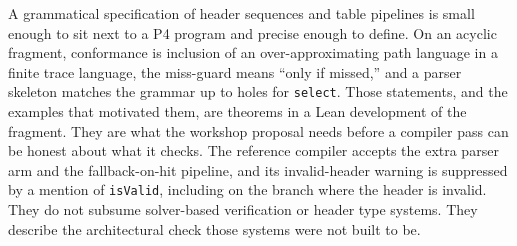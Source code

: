\documentclass[a4paper,UKenglish,cleveref,autoref]{lipics-v2021}
\begin{document}
A grammatical specification of header sequences and table pipelines is small enough to sit next to a P4 program and precise enough to define.
On an acyclic fragment, conformance is inclusion of an over-approximating path language in a finite trace language, the miss-guard means ``only if missed,'' and a parser skeleton matches the grammar up to holes for \texttt{select}.
Those statements, and the examples that motivated them, are theorems in a Lean development of the fragment.
They are what the workshop proposal needs before a compiler pass can be honest about what it checks.
The reference compiler accepts the extra parser arm and the fallback-on-hit pipeline, and its invalid-header warning is suppressed by a mention of \texttt{isValid}, including on the branch where the header is invalid.
They do not subsume solver-based verification or header type systems.
They describe the architectural check those systems were not built to be.

\begingroup
\raggedright

\endgroup
\end{document}

